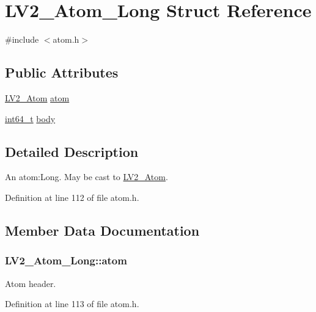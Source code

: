 \hypertarget{struct_l_v2___atom___long}{}\section{L\+V2\+\_\+\+Atom\+\_\+\+Long Struct Reference}
\label{struct_l_v2___atom___long}


{\ttfamily \#include $<$atom.\+h$>$}

\subsection*{Public Attributes}
\begin{DoxyCompactItemize}
\item 
\hyperlink{struct_l_v2___atom}{L\+V2\+\_\+\+Atom} \hyperlink{struct_l_v2___atom___long_a130c3e85522ccdafc82ebcaf6b84ee0d}{atom}
\item 
\hyperlink{lib-src_2ffmpeg_2win32_2stdint_8h_a67a9885ef4908cb72ce26d75b694386c}{int64\+\_\+t} \hyperlink{struct_l_v2___atom___long_ad5e9317cb37db6804aab62580b182a94}{body}
\end{DoxyCompactItemize}


\subsection{Detailed Description}
An atom\+:Long. May be cast to \hyperlink{struct_l_v2___atom}{L\+V2\+\_\+\+Atom}. 

Definition at line 112 of file atom.\+h.



\subsection{Member Data Documentation}
\subsubsection[{\texorpdfstring{atom}{atom}}]{ L\+V2\+\_\+\+Atom\+\_\+\+Long\+::atom}\hypertarget{struct_l_v2___atom___long_a130c3e85522ccdafc82ebcaf6b84ee0d}{}\label{struct_l_v2___atom___long_a130c3e85522ccdafc82ebcaf6b84ee0d}
Atom header. 

Definition at line 113 of file atom.\+h.

